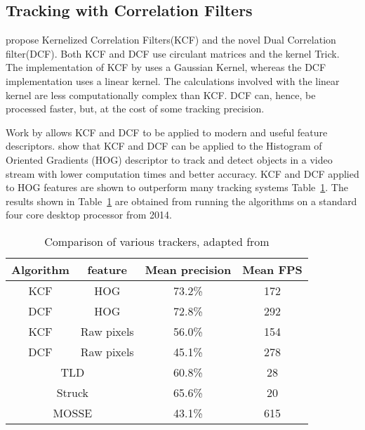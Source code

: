 \subsection{Tracking with Correlation Filters}
\citeauthor{Enriques2014} \cite{Enriques2014} propose Kernelized Correlation Filters(KCF) and the novel Dual Correlation filter(DCF).
Both KCF and DCF use circulant matrices and the kernel Trick.
The implementation of KCF by \citeauthor{Enriques2014} uses a Gaussian Kernel, whereas the DCF implementation uses a linear kernel.
The calculations involved with the linear kernel are less computationally complex than KCF. 
DCF can, hence, be processed faster, but, at the cost of some tracking precision.

Work by \citeauthor{multichannelCorrFilters} \cite{multichannelCorrFilters} allows KCF and DCF to be applied to modern and useful feature descriptors.
\citeauthor{Enriques2014} show that KCF and DCF can be applied to the Histogram of Oriented Gradients (HOG) descriptor to track and detect objects in a video stream with lower computation times and better accuracy.
KCF and DCF applied to HOG features are shown to outperform many tracking systems Table~\ref{tab:trackers}.
The results shown in Table~\ref{tab:trackers} are obtained from running the algorithms on a standard four core desktop processor from 2014.

\begin{table}
  \centering
  \begin{tabular}[t]{cccc}
    \toprule
    Algorithm & feature & Mean precision & Mean FPS \\
    \midrule
    KCF       & HOG     & 73.2\%         & 172      \\
    \hline
    DCF       & HOG     & 72.8\%         & 292      \\
    \hline
    KCF       & Raw pixels & 56.0\%      & 154      \\
    \hline
    DCF       & Raw pixels & 45.1\%      & 278      \\
    \midrule
    \midrule
    \multicolumn{2}{c}{TLD}   & 60.8\%      &  28      \\
    \hline
    \multicolumn{2}{c}{Struck\cite{struck}}& 65.6\%     &  20     \\
    \hline
    \multicolumn{2}{c}{MOSSE\cite{mosse}}& 43.1\%      &  615     \\
    \bottomrule
  \end{tabular}
  \caption{Comparison of various trackers, adapted from \cite{Enriques2014}}
  \label{tab:trackers}
\end{table}

